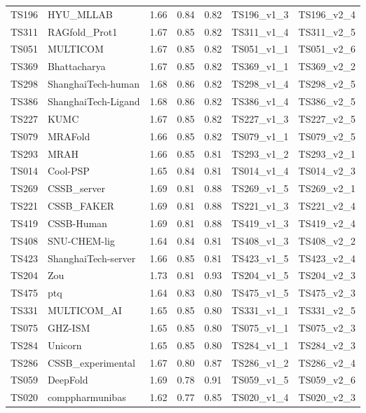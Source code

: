 \begin{longtable}{lllllll}
TS196 & HYU\_MLLAB & 1.66 & 0.84 & 0.82 & TS196\_v1\_3 & TS196\_v2\_4 \\ 
TS311 & RAGfold\_Prot1 & 1.67 & 0.85 & 0.82 & TS311\_v1\_4 & TS311\_v2\_5 \\ 
TS051 & MULTICOM & 1.67 & 0.85 & 0.82 & TS051\_v1\_1 & TS051\_v2\_6 \\ 
TS369 & Bhattacharya & 1.67 & 0.85 & 0.82 & TS369\_v1\_1 & TS369\_v2\_2 \\ 
TS298 & ShanghaiTech-human & 1.68 & 0.86 & 0.82 & TS298\_v1\_4 & TS298\_v2\_5 \\ 
TS386 & ShanghaiTech-Ligand & 1.68 & 0.86 & 0.82 & TS386\_v1\_4 & TS386\_v2\_5 \\ 
TS227 & KUMC & 1.67 & 0.85 & 0.82 & TS227\_v1\_3 & TS227\_v2\_5 \\ 
TS079 & MRAFold & 1.66 & 0.85 & 0.82 & TS079\_v1\_1 & TS079\_v2\_5 \\ 
TS293 & MRAH & 1.66 & 0.85 & 0.81 & TS293\_v1\_2 & TS293\_v2\_1 \\ 
TS014 & Cool-PSP & 1.65 & 0.84 & 0.81 & TS014\_v1\_4 & TS014\_v2\_3 \\ 
TS269 & CSSB\_server & 1.69 & 0.81 & 0.88 & TS269\_v1\_5 & TS269\_v2\_1 \\ 
TS221 & CSSB\_FAKER & 1.69 & 0.81 & 0.88 & TS221\_v1\_3 & TS221\_v2\_4 \\ 
TS419 & CSSB-Human & 1.69 & 0.81 & 0.88 & TS419\_v1\_3 & TS419\_v2\_4 \\ 
TS408 & SNU-CHEM-lig & 1.64 & 0.84 & 0.81 & TS408\_v1\_3 & TS408\_v2\_2 \\ 
TS423 & ShanghaiTech-server & 1.66 & 0.85 & 0.81 & TS423\_v1\_5 & TS423\_v2\_4 \\ 
TS204 & Zou & 1.73 & 0.81 & 0.93 & TS204\_v1\_5 & TS204\_v2\_3 \\ 
TS475 & ptq & 1.64 & 0.83 & 0.80 & TS475\_v1\_5 & TS475\_v2\_3 \\ 
TS331 & MULTICOM\_AI & 1.65 & 0.85 & 0.80 & TS331\_v1\_1 & TS331\_v2\_5 \\ 
TS075 & GHZ-ISM & 1.65 & 0.85 & 0.80 & TS075\_v1\_1 & TS075\_v2\_3 \\ 
TS284 & Unicorn & 1.65 & 0.85 & 0.80 & TS284\_v1\_1 & TS284\_v2\_3 \\ 
TS286 & CSSB\_experimental & 1.67 & 0.80 & 0.87 & TS286\_v1\_2 & TS286\_v2\_4 \\ 
TS059 & DeepFold & 1.69 & 0.78 & 0.91 & TS059\_v1\_5 & TS059\_v2\_6 \\ 
TS020 & comppharmunibas & 1.62 & 0.77 & 0.85 & TS020\_v1\_4 & TS020\_v2\_3 \\ 

\end{longtable}
